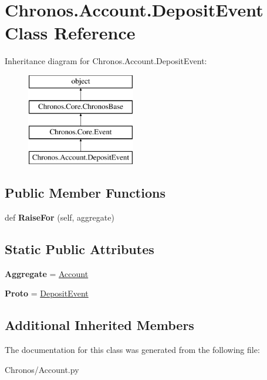 \hypertarget{classChronos_1_1Account_1_1DepositEvent}{}\section{Chronos.\+Account.\+Deposit\+Event Class Reference}
\label{classChronos_1_1Account_1_1DepositEvent}
Inheritance diagram for Chronos.\+Account.\+Deposit\+Event\+:\begin{figure}[H]
\begin{center}
\leavevmode
\includegraphics[height=4.000000cm]{classChronos_1_1Account_1_1DepositEvent}
\end{center}
\end{figure}
\subsection*{Public Member Functions}
\begin{DoxyCompactItemize}
\item 
def {\bfseries Raise\+For} (self, aggregate)\hypertarget{classChronos_1_1Account_1_1DepositEvent_a8788bc61a88d96dc1ae62cff017f5dab}{}\label{classChronos_1_1Account_1_1DepositEvent_a8788bc61a88d96dc1ae62cff017f5dab}

\end{DoxyCompactItemize}
\subsection*{Static Public Attributes}
\begin{DoxyCompactItemize}
\item 
{\bfseries Aggregate} = \hyperlink{classChronos_1_1Account_1_1Account}{Account}\hypertarget{classChronos_1_1Account_1_1DepositEvent_ac809d258297b95ed3d74ad71cfd563e2}{}\label{classChronos_1_1Account_1_1DepositEvent_ac809d258297b95ed3d74ad71cfd563e2}

\item 
{\bfseries Proto} = \hyperlink{classChronos_1_1Account_1_1DepositEvent}{Deposit\+Event}\hypertarget{classChronos_1_1Account_1_1DepositEvent_ade6577da7efe005d962f5cac596be02f}{}\label{classChronos_1_1Account_1_1DepositEvent_ade6577da7efe005d962f5cac596be02f}

\end{DoxyCompactItemize}
\subsection*{Additional Inherited Members}


The documentation for this class was generated from the following file\+:\begin{DoxyCompactItemize}
\item 
Chronos/Account.\+py\end{DoxyCompactItemize}
